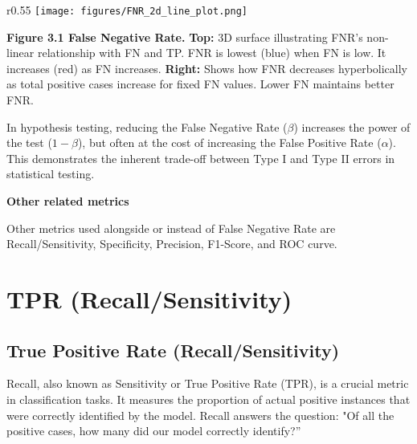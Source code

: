 \begin{wrapfigure}{r}{0.55\textwidth}
    \centering
    \vspace{-20pt} %
    \texttt{[image: figures/FNR\_2d\_line\_plot.png]} %
\end{wrapfigure}

\textbf{Figure 3.1 False Negative Rate.} 
\textbf{Top:}
3D surface illustrating FNR's non-linear relationship with FN and TP. FNR is lowest (blue) when FN is low. It increases (red) as FN increases.
\textbf{Right:}
Shows how FNR decreases hyperbolically as total positive cases increase for fixed FN values. Lower FN maintains better FNR.


{
    In hypothesis testing, reducing the False Negative Rate ($\beta$) increases the power of the test ($1 - \beta$), but often at the cost of increasing the False Positive Rate ($\alpha$).
    This demonstrates the inherent trade-off between Type I and Type II errors in statistical testing.
}

\textbf{Other related metrics}

Other metrics used alongside or instead of False Negative Rate
are Recall/Sensitivity, Specificity, Precision, F1-Score, and ROC curve.

\clearpage
\section{TPR (Recall/Sensitivity)}
\subsection{True Positive Rate (Recall/Sensitivity)}
\thispagestyle{classificationstyle}

Recall, also known as Sensitivity or True Positive Rate (TPR), is a crucial metric in classification tasks. It measures the proportion of actual
positive instances that were correctly identified by the model. Recall answers the question: "Of all the positive cases, how many did our model correctly identify?”

\begin{center}
\end{center}

